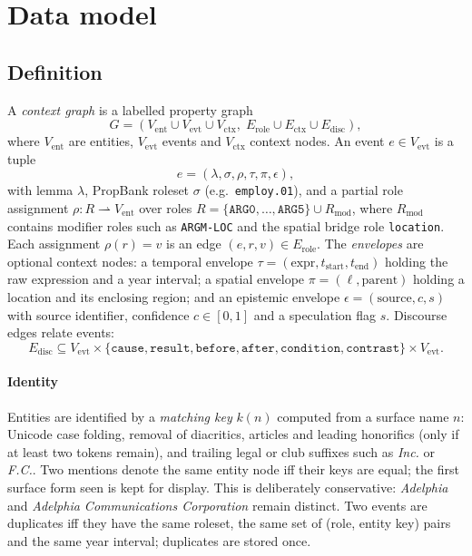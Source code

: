 \documentclass[preprint,12pt,authoryear]{elsarticle}
\begin{document}
\section{Data model}
\label{sec:model}

\subsection{Definition}

A \emph{context graph} is a labelled property graph
\begin{equation}
G = (V_{\mathrm{ent}} \cup V_{\mathrm{evt}} \cup V_{\mathrm{ctx}},\; E_{\mathrm{role}} \cup E_{\mathrm{ctx}} \cup E_{\mathrm{disc}}),
\end{equation}
where $V_{\mathrm{ent}}$ are entities, $V_{\mathrm{evt}}$ events and $V_{\mathrm{ctx}}$ context nodes.
An event $e \in V_{\mathrm{evt}}$ is a tuple
\begin{equation}
e = (\lambda, \sigma, \rho, \tau, \pi, \epsilon),
\end{equation}
with lemma $\lambda$, PropBank roleset $\sigma$ (e.g.\ \texttt{employ.01}), and a partial role assignment $\rho : R \rightharpoonup V_{\mathrm{ent}}$ over roles $R = \{\texttt{ARG0},\dots,\texttt{ARG5}\} \cup R_{\mathrm{mod}}$, where $R_{\mathrm{mod}}$ contains modifier roles such as \texttt{ARGM-LOC} and the spatial bridge role \texttt{location}.
Each assignment $\rho(r) = v$ is an edge $(e, r, v) \in E_{\mathrm{role}}$.
The \emph{envelopes} are optional context nodes:
a temporal envelope $\tau = (\text{expr}, t_{\text{start}}, t_{\text{end}})$ holding the raw expression and a year interval;
a spatial envelope $\pi = (\ell, \text{parent})$ holding a location and its enclosing region;
and an epistemic envelope $\epsilon = (\text{source}, c, s)$ with source identifier, confidence $c \in [0,1]$ and a speculation flag $s$.
Discourse edges relate events:
\begin{equation}
E_{\mathrm{disc}} \subseteq V_{\mathrm{evt}} \times \{\texttt{cause}, \texttt{result}, \texttt{before}, \texttt{after}, \texttt{condition}, \texttt{contrast}\} \times V_{\mathrm{evt}}.
\end{equation}

\paragraph{Identity}
Entities are identified by a \emph{matching key} $k(n)$ computed from a surface name $n$: Unicode case folding, removal of diacritics, articles and leading honorifics (only if at least two tokens remain), and trailing legal or club suffixes such as \textit{Inc.} or \textit{F.C.}.
Two mentions denote the same entity node iff their keys are equal; the first surface form seen is kept for display.
This is deliberately conservative: \textit{Adelphia} and \textit{Adelphia Communications Corporation} remain distinct.
Two events are duplicates iff they have the same roleset, the same set of (role, entity key) pairs and the same year interval; duplicates are stored once.
\end{document}
